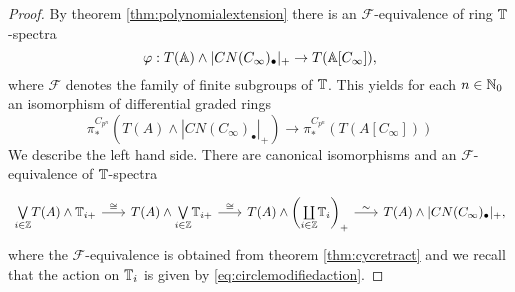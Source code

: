 \begin{proof}
By theorem \ref{thm:polynomialextension} there is an $\mathcal{F}$-equivalence
of ring $\mathbb{T}$-spectra
\[
\varphi: T(\mathbb{A})\wedge |CN(C_\infty)_\bullet|_+\to T(\mathbb{A}[C_\infty]),
\]
where $\mathcal{F}$ denotes the family of finite subgroups of $\mathbb{T}$.
This yields for each $n\in \mathbb{N}_0$ an isomorphism of differential graded rings
\begin{equation}\label{eq:original}
\pi_\ast^{C_{p^{n}}}( T(A)\wedge \left|CN(C_\infty)_\bullet\right|_+ )
\rightarrow \pi_\ast^{C_{p^{n}}}( T(A[C_\infty]) )
\end{equation}
We describe the left hand side. There are canonical isomorphisms
and an $\mathcal{F}$-equivalence of $\mathbb{T}$-spectra
\begin{equation}
\begin{tikzcd}[column sep = scriptsize]
\underset{i\in \ZZ}{\bigvee} T(A)\wedge \TT_{i+}
\arrow{r}{\cong} 
&T(A)\wedge\underset{i\in \ZZ}{\bigvee} \TT_{i+}
\arrow{r}{\cong}
&T(A)\wedge\left(\underset{i\in \ZZ}{\coprod} \TT_{i}\right)_+
\arrow{r}{\sim}
&T(A)\wedge\lvert CN(C_\infty)_\bullet \rvert_+,
\end{tikzcd}
\end{equation}
where the $\mathcal{F}$-equivalence is obtained from theorem \ref{thm:cycretract} and we recall that
the action on $\mathbb{T}_i$ is given by \eqref{eq:circlemodifiedaction}. 





\end{proof}
